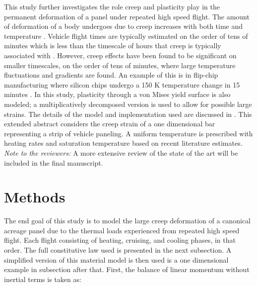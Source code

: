 \documentclass[conf]{new-aiaa}
\begin{document}
This study further investigates the role creep and plasticity play 
in the permanent deformation of a panel under repeated high speed flight.
The amount of deformation of a body undergoes due to creep increases 
with both time and temperature
\cite{roylance_mechanics_of_materials_text}. 
Vehicle flight times are typically estimated on the order
of tens of minutes 
\cite{ 
  kordes_structureal_heating_experiencs_on_the_x15_airplane,
  lafontaine_effects_of_strain_hardeing_on_response_of_skin_panels_in_hypersonic_flow,
  zuchowski_AVIATR_Predictive_capability_for_hypersonic_structural_response_and_life_prediction_phase_II}
which is less than the timescale of hours that creep is 
typically associated with 
\cite{ 
  lavina_creep_behavior_of_Ti6Al4V_from_450C_to_600C,
  evans_effects_of_alpha_case_formation_on_creep_fracture_properties_of_the_high_temperature_titanium_alloy_IMI834,
  roylance_mechanics_of_materials_text}.
However, creep effects have been found to be significant on smaller timescales,
on the order of tens of minutes,
where large temperature fluctuations and gradients are found.
An example of this is in flip-chip manufacturing 
where silicon chips undergo a 150 K temperature change 
in 15 minutes
\cite{ 
  li_simulation_of_finite_strain_inelastic_phenomena_governed_by_creep_and_plasticity}.
In this study, plasticity through a von Mises yield surface is also modeled;
a multiplicatively decomposed version is used to allow for 
possible large strains.
The details of the model and implementation used are
discussed in 
\cite{ li_simulation_of_finite_strain_inelastic_phenomena_governed_by_creep_and_plasticity}.
This extended abstract considers the creep strain of a one dimensional bar
representing a strip of vehicle paneling.
A uniform temperature is prescribed with heating rates and saturation 
temperature based on recent literature estimates.
\newline
\newline
\noindent
\emph{Note to the reviewers:} A more extensive review of the 
state of the art will be included in the 
final manuscript.

\section{Methods} \label{sec_methods} 

The end goal of this study is to model the large creep deformation of a canonical acreage
panel due to the thermal loads experienced from repeated high speed flight.
Each flight consisting of heating, cruising, and cooling phases, in that order.
The full constitutive law used is presented in the next subsection.
A simplified version of this material model is then used
is a one dimensional example in subsection after that. 
First, the balance of linear momentum without inertial terms is taken as:
\end{document}
